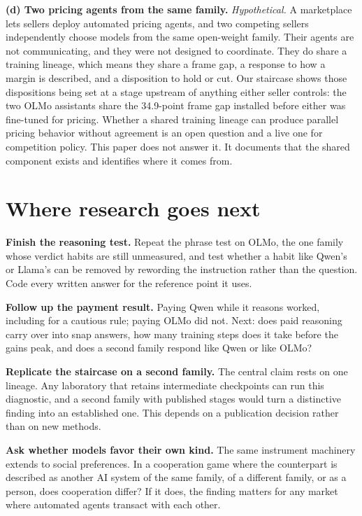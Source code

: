 \documentclass[11pt]{article}
\begin{document}
\textbf{(d) Two pricing agents from the same family.} \emph{Hypothetical.} A marketplace lets
sellers deploy automated pricing agents, and two competing sellers independently choose models
from the same open-weight family. Their agents are not communicating, and they were not designed
to coordinate. They do share a training lineage, which means they share a frame gap, a response
to how a margin is described, and a disposition to hold or cut. Our staircase shows those
dispositions being set at a stage upstream of anything either seller controls: the two OLMo
assistants share the 34.9-point frame gap installed before either was fine-tuned for pricing.
Whether a shared training lineage can produce parallel pricing behavior without agreement is an
open question and a live one for competition policy. This paper does not answer it. It documents
that the shared component exists and identifies where it comes from.

\section{Where research goes next}

\textbf{Finish the reasoning test.} Repeat the phrase test on OLMo, the one family whose verdict
habits are still unmeasured, and test whether a habit like Qwen's or Llama's can be removed by
rewording the instruction rather than the question.
Code every written answer for the reference point it uses.

\textbf{Follow up the payment result.} Paying Qwen while it reasons worked, including for a cautious
rule; paying OLMo did not. Next: does paid reasoning carry over into snap answers, how many training
steps does it take before the gains peak, and does a second family respond like Qwen or like OLMo?

\textbf{Replicate the staircase on a second family.} The central claim rests on one lineage. Any
laboratory that retains intermediate checkpoints can run this diagnostic, and a second family
with published stages would turn a distinctive finding into an established one. This depends on a
publication decision rather than on new methods.

\textbf{Ask whether models favor their own kind.} The same instrument machinery extends to
social preferences. In a cooperation game where the counterpart is described as another AI system
of the same family, of a different family, or as a person, does cooperation differ? If it does,
the finding matters for any market where automated agents transact with each other.
\end{document}
